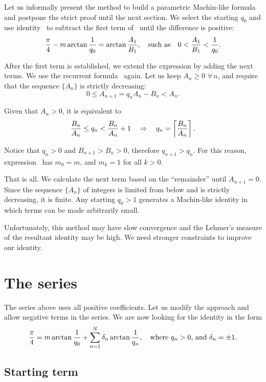 \documentclass[draft, 10pt]{article} %
\begin{document}
Let us informally present the method to build a parametric Machin-like formula and postpone
the strict proof until the next section.
We select the starting $q_0$ and use identity~ to subtract
the first term of~ until the difference is positive:
$$
\dfrac{\pi}{4} - m \arctan\dfrac{1}{q_0} = \arctan\dfrac{A_1}{B_1}, \quad\hbox{such as}\quad
0 < \dfrac{A_1}{B_1} < \dfrac{1}{q_0}.
$$

After the first term is established,
we extend the expression by adding the next terms.
We use the recurrent formula~ again.
Let us keep $A_n \ge 0$ $\forall \, n$,
and require that the sequence $\{ A_n \}$ is strictly decreasing:
$$
0 \le A_{n+1} = q_n A_n - B_n < A_n.
$$

Given that $A_n > 0$, it is equivalent to
$$
\dfrac{B_n}{A_n} \le q_n < \dfrac{B_n}{A_n} + 1 \quad\ergo\quad 
q_n = \nceil{\dfrac{B_n}{A_n}}.
$$

Notice that $q_n > 0$ and $B_{n+1} > B_n > 0$, therefore $q_{n+1} > q_n$.
For this reason, expression~ has $m_0 = m$, and $m_k = 1$ for all $k>0$.

That is all. We calculate the next term based on the ``remainder'' until $A_{n+1} = 0$.
Since the sequence $\{ A_n \}$ of integers is limited from below and is strictly decreasing, it is finite.
Any starting $q_0 > 1$ generates a Machin-like identity in which terms
can be made arbitrarily small.

Unfortunately, this method may have slow convergence and the Lehmer's measure of
the resultant identity may be high.
We need stronger constraints to improve our identity.
 
\section{The series}

The series above uses all positive coefficients. Let us modify the approach and allow
negative terms in the series. We are now looking for the identity in the form
%
\begin{equation}\mlabel{machin-switch}
\dfrac{\pi}{4} = m \arctan \dfrac{1}{q_0} +
    \sum_{n=1}^N \delta_n \arctan \dfrac{1}{q_n},
    \quad\hbox{where $q_n > 0$, and $\delta_n=\pm 1$.}
\end{equation}

\subsection{Starting term}
\end{document}
